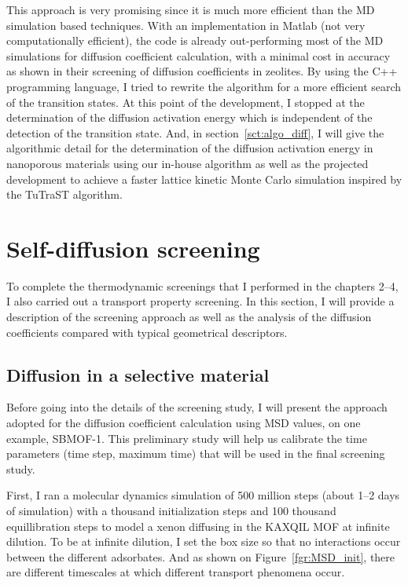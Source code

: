 \documentclass[main]{subfiles}
\begin{document}
This approach is very promising since it is much more efficient than the MD simulation based techniques. With an implementation in Matlab (not very computationally efficient), the code is already out-performing most of the MD simulations for diffusion coefficient calculation, with a minimal cost in accuracy as shown in their screening of diffusion coefficients in zeolites. By using the C++ programming language, I tried to rewrite the algorithm for a more efficient search of the transition states. At this point of the development, I stopped at the determination of the diffusion activation energy which is independent of the detection of the transition state. And, in section~\ref{sct:algo_diff}, I will give the algorithmic detail for the determination of the diffusion activation energy in nanoporous materials using our in-house algorithm as well as the projected development to achieve a faster lattice kinetic Monte Carlo simulation inspired by the TuTraST algorithm.


\section{Self-diffusion screening}\label{sct:md_screening}

To complete the thermodynamic screenings that I performed in the chapters 2--4, I also carried out a transport property screening. In this section, I will provide a description of the screening approach as well as the analysis of the diffusion coefficients compared with typical geometrical descriptors.

\subsection{Diffusion in a selective material}

Before going into the details of the screening study, I will present the approach adopted for the diffusion coefficient calculation using MSD values, on one example, SBMOF-1\autocite{Banerjee_2016}. This preliminary study will help us calibrate the time parameters (time step, maximum time) that will be used in the final screening study.

First, I ran a molecular dynamics simulation of 500 million steps (about 1--2 days of simulation) with a thousand initialization steps and 100 thousand equillibration steps to model a xenon diffusing in the KAXQIL\autocite{Banerjee2012} MOF at infinite dilution. To be at infinite dilution, I set the box size so that no interactions occur between the different adsorbates. And as shown on Figure~\ref{fgr:MSD_init}, there are different timescales at which different transport phenomena occur. 
\end{document}
